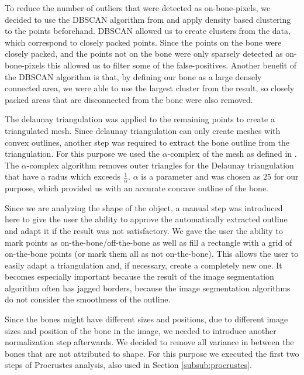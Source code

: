 \documentclass[pdftex,12pt,a4paper]{report}
\begin{document}
To reduce the number of outliers that were detected as on-bone-pixels,
we decided to use the DBSCAN algorithm from \cite{ester1996density} and apply density based clustering to the points
beforehand. DBSCAN allowed us to create clusters from the data, which correspond to closely packed points. Since
the points on the bone were closely packed, and the points not on the bone were only sparsely detected as
on-bone-pixels this allowed us to filter some of the false-positives. Another benefit of the DBSCAN algorithm is that,
by defining our bone as a large densely connected area, we were able to use the largest cluster from the result,
so closely packed areas that are disconnected from the bone were also removed.

The delaunay triangulation was applied to the remaining points to create a triangulated mesh. Since delaunay
triangulation can only create meshes with convex outlines, another step was required to extract the bone outline
from the triangulation. For this purpose we used the $\alpha$-complex of the mesh as defined in \cite{akkirajualpha}.
The $\alpha$-complex algorithm removes outer triangles for the Delaunay triangulation that have a radus which exceeds
$\frac{1}{\alpha}$. $\alpha$ is a parameter and was chosen as $25$ for our purpose, which provided us with
an accurate concave outline of the bone.

Since we are analyzing the shape of the object, a manual step was introduced here to give the user the ability to
approve the automatically extracted outline and adapt it if the result was not satisfactory. We gave the user the
ability to mark points as on-the-bone/off-the-bone as well as fill a rectangle with a grid of on-the-bone points (or mark them all as not on-the-bone).
This allows the user to easily adapt a triangulation and, if necessary, create a completely new one. It becomes
especially important because the result of the image segmentation algorithm often has jagged borders, because the
image segmentation algorithms do not consider the smoothness of the outline.

Since the bones might have different sizes and positions, due to different image sizes and position of the bone in
the image, we needed to introduce another normalization step afterwards. We decided to remove all variance in between the bones that are not attributed to shape. For this purpose we executed the first two steps of Procrustes
analysis, also used in Section \ref{subsub:procrustes}.
\end{document}
